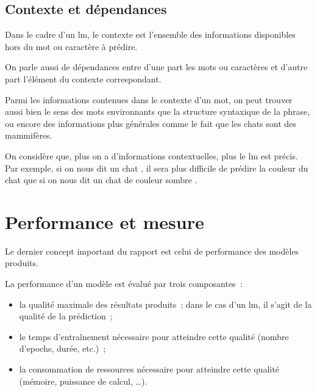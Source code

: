\subsection{Contexte et dépendances}
Dans le cadre d'un \gls{lm}, le contexte est l'ensemble des informations disponibles hors du mot ou caractère à prédire.

On parle aussi de dépendances entre d'une part les mots ou caractères et d'autre part l'élément du contexte correspondant.

Parmi les informations contenues dans le contexte d'un mot, on peut trouver aussi bien le sens des mots environnants que la structure syntaxique de la phrase, ou encore des informations plus générales comme le fait que les chats sont des mammifères.


On considère que, plus on a d'informations contextuelles, plus le \gls{lm} est précis. Par exemple, si on nous dit \og un chat \fg{}, il sera plus difficile de prédire la couleur du chat que si on nous dit \og un chat de couleur sombre \fg{}.

\section{Performance et mesure}
Le dernier concept important du rapport est celui de performance des modèles produits.

La performance d'un modèle est évalué par trois composantes~:
\begin{itemize}
	\item la qualité maximale des résultats produits~; dans le cas d'un \gls{lm}, il s'agit de la qualité de la prédiction~;
	\item le temps d'entraînement nécessaire pour atteindre cette qualité (nombre d'\glspl{epoch}, durée, etc.)~;
	\item la consommation de ressources nécessaire pour atteindre cette qualité (mémoire, puissance de calcul, \dots).
\end{itemize}
\vspace{1em}

